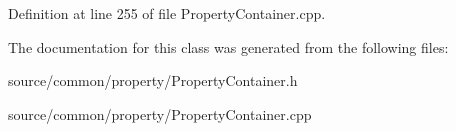 Definition at line 255 of file Property\-Container.\-cpp.



The documentation for this class was generated from the following files\-:\begin{DoxyCompactItemize}
\item 
source/common/property/Property\-Container.\-h\item 
source/common/property/Property\-Container.\-cpp\end{DoxyCompactItemize}
